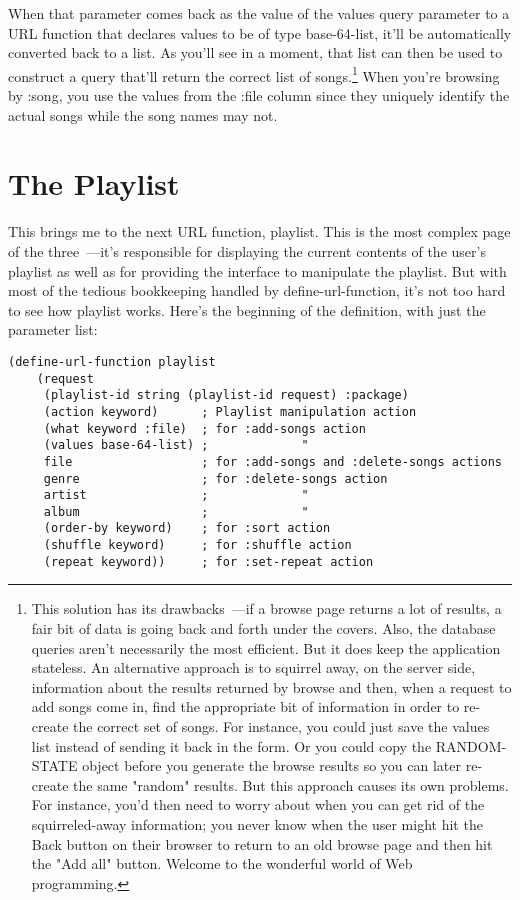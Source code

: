 When that parameter comes back as the value of the values query parameter to a URL
function that declares values to be of type base-64-list, it'll be automatically converted
back to a list. As you'll see in a moment, that list can then be used to construct a query
that'll return the correct list of songs.\footnote{This solution has its drawbacks~---if a
  browse page returns a lot of results, a fair bit of data is going back and forth under
  the covers. Also, the database queries aren't necessarily the most efficient. But it
  does keep the application stateless. An alternative approach is to squirrel away, on the
  server side, information about the results returned by browse and then, when a request
  to add songs come in, find the appropriate bit of information in order to re-create the
  correct set of songs. For instance, you could just save the values list instead of
  sending it back in the form. Or you could copy the RANDOM-STATE object before you
  generate the browse results so you can later re-create the same "random" results. But
  this approach causes its own problems. For instance, you'd then need to worry about when
  you can get rid of the squirreled-away information; you never know when the user might
  hit the Back button on their browser to return to an old browse page and then hit the
  "Add all" button. Welcome to the wonderful world of Web programming.} When you're
browsing by :song, you use the values from the :file column since they uniquely identify
the actual songs while the song names may not.

\section{The Playlist}

This brings me to the next URL function, playlist. This is the most complex page of the
three~---it's responsible for displaying the current contents of the user's playlist as
well as for providing the interface to manipulate the playlist. But with most of the
tedious bookkeeping handled by define-url-function, it's not too hard to see how playlist
works. Here's the beginning of the definition, with just the parameter list:

\begin{lstlisting}
(define-url-function playlist 
    (request
     (playlist-id string (playlist-id request) :package)
     (action keyword)      ; Playlist manipulation action
     (what keyword :file)  ; for :add-songs action
     (values base-64-list) ;             "
     file                  ; for :add-songs and :delete-songs actions
     genre                 ; for :delete-songs action
     artist                ;             "
     album                 ;             "
     (order-by keyword)    ; for :sort action
     (shuffle keyword)     ; for :shuffle action
     (repeat keyword))     ; for :set-repeat action
\end{lstlisting}

